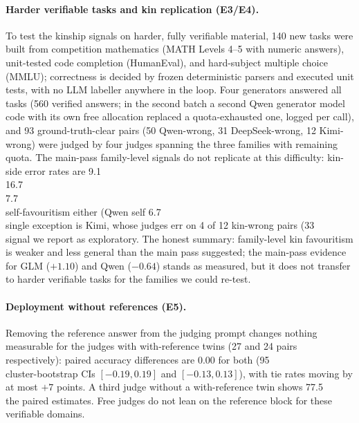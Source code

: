 \documentclass[review,12pt]{elsarticle}
\begin{document}
\paragraph{Harder verifiable tasks and kin replication (E3/E4).}
To test the kinship signals on harder, fully verifiable material, 140 new
tasks were built from competition mathematics (MATH Levels 4--5 with
numeric answers), unit-tested code completion (HumanEval), and
hard-subject multiple choice (MMLU); correctness is decided by frozen
deterministic parsers and executed unit tests, with no LLM labeller
anywhere in the loop. Four generators answered all tasks (560 verified
answers; in the second batch a second Qwen generator model code with its
own free allocation replaced a quota-exhausted one, logged per call), and
93 ground-truth-clear pairs (50 Qwen-wrong, 31 DeepSeek-wrong, 12
Kimi-wrong) were judged by four judges spanning the three families with
remaining quota. The main-pass family-level signals do not replicate at
this difficulty: kin-side error rates are 9.1\\%
16.7\\%
7.7\\%
self-favouritism either (Qwen self 6.7\\%
single exception is Kimi, whose judges err on 4 of 12 kin-wrong pairs
(33\\%
signal we report as exploratory. The honest summary: family-level kin
favouritism is weaker and less general than the main pass suggested; the
main-pass evidence for GLM ($+1.10$) and Qwen ($-0.64$) stands as
measured, but it does not transfer to harder verifiable tasks for the
families we could re-test.

\paragraph{Deployment without references (E5).}
Removing the reference answer from the judging prompt changes nothing
measurable for the judges with with-reference twins (27 and 24 pairs
respectively): paired accuracy differences are 0.00 for both (95\\%
cluster-bootstrap CIs $[-0.19, 0.19]$ and $[-0.13, 0.13]$), with tie
rates moving by at most $+7$ points. A third judge without a
with-reference twin shows 77.5\\%
the paired estimates. Free judges do not lean on the reference block for
these verifiable domains.
\end{document}
